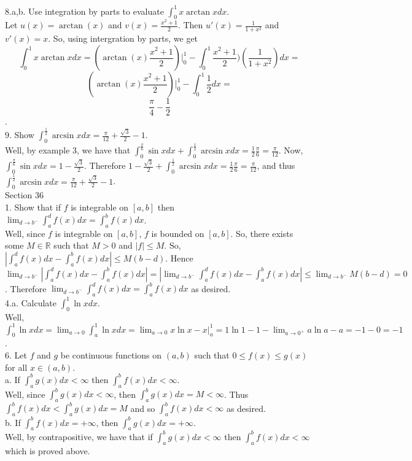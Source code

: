 \documentclass[12pt]{article}
\begin{document}
8.a,b. Use integration by parts to evaluate $\int_0^1x\arctan xdx$.\\
Let $u(x)=\arctan(x)$ and $v(x)=\frac{x^2+1}{2}$. Then $u'(x)=\frac{1}{1+x^2}$ and $v'(x)=x$. So, using intergration by parts, we get $$\int_0^1x\arctan xdx=(\arctan(x)\frac{x^2+1}{2})|_0^1-\int_0^1\frac{x^2+1}{2})(\frac{1}{1+x^2})dx=$$ $$(\arctan(x)\frac{x^2+1}{2})|_0^1-\int_0^1\frac12dx=$$ $$\frac{\pi}{4}-\frac12$$.\\[20pt]

9. Show $\int_0^{\frac12}\arcsin xdx=\frac{\pi}{12}+\frac{\sqrt{3}}{2}-1$.\\
Well, by example 3, we have that $\int_0^{\frac{\pi}{6}}\sin xdx+\int_0^{\frac12}\arcsin xdx=\frac12\frac{\pi}{6}=\frac{\pi}{12}$. Now, $\int_0^{\frac{\pi}{6}}\sin xdx=1-\frac{\sqrt{3}}{2}$. Therefore $1-\frac{\sqrt{3}}{2}+\int_0^{\frac12}\arcsin xdx=\frac12\frac{\pi}{6}=\frac{\pi}{12}$, and thus $\int_0^{\frac12}\arcsin xdx=\frac{\pi}{12}+\frac{\sqrt{3}}{2}-1$.\\[20pt]

\noindent Section 36\\

1. Show that if $f$ is integrable on $[a,b]$ then $\lim_{d\rightarrow b^-}\int_a^df(x)dx=\int_a^bf(x)dx$.\\
Well, since $f$ is integrable on $[a,b]$, $f$ is bounded on $[a,b]$. So, there exists some $M\in\mathbb{R}$ such that $M>0$ and $|f|\leq M$. So, $|\int_a^df(x)dx-\int_a^bf(x)dx|\leq M(b-d)$. Hence $\lim_{d\rightarrow b^-}|\int_a^df(x)dx-\int_a^bf(x)dx|=|\lim_{d\rightarrow b^-}\int_a^df(x)dx-\int_a^bf(x)dx|\leq \lim_{d\rightarrow b^-}M(b-d)=0$. Therefore $\lim_{d\rightarrow b^-}\int_a^df(x)dx=\int_a^bf(x)dx$ as desired.\\[20pt]

4.a. Calculate $\int_0^1\ln xdx$.\\
Well, $\int_0^1\ln xdx=\lim_{a\rightarrow0}\int_a^1\ln xdx=\lim_{a\rightarrow0}x\ln x-x|_a^1=1\ln1-1-\lim_{a\rightarrow0^+}a\ln a-a=-1-0=-1$.\\[20pt]

6. Let $f$ and $g$ be continuous functions on $(a,b)$ such that $0\leq f(x)\leq g(x)$ for all $x\in(a,b)$.\\
a. If $\int_a^bg(x)dx<\infty$ then $\int_a^bf(x)dx<\infty$.\\
Well, since $\int_a^bg(x)dx<\infty$, then $\int_a^bg(x)dx=M<\infty$. Thus $\int_a^bf(x)dx<\int_a^bg(x)dx=M$ and so $\int_a^bf(x)dx<\infty$ as desired.\\
b. If $\int_a^bf(x)dx=+\infty$, then $\int_a^bg(x)dx=+\infty$.\\
Well, by contrapositive, we have that if $\int_a^bg(x)dx<\infty$ then $\int_a^bf(x)dx<\infty$ which is proved above.\\[20pt]
\end{document}
